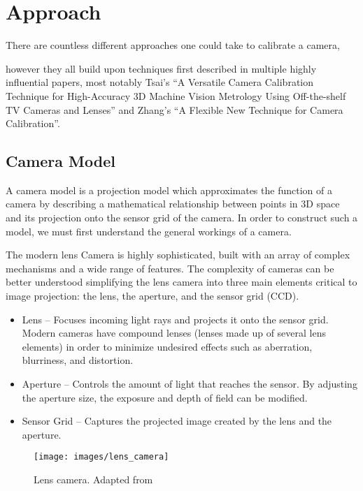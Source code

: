 \section{Approach} 

There are countless different approaches one could take to calibrate a camera, 



however they all build upon techniques first described in multiple highly influential papers, most notably Tsai's ``A Versatile Camera Calibration Technique for High-Accuracy 3D Machine Vision Metrology Using Off-the-shelf TV Cameras and Lenses'' and Zhang's ``A Flexible New Technique for Camera Calibration''. 
\subsection{Camera Model} \label{sec:camera_model}

A camera model is a projection model which approximates the function of a camera by describing a mathematical relationship between points in 3D space and its projection onto the sensor grid of the camera. In order to construct such a model, we must first understand the general workings of a camera.

The modern lens Camera is highly sophisticated, built with an array of complex mechanisms and a wide range of features. The complexity of cameras can be better understood simplifying the lens camera into three main elements critical to image projection: the lens, the aperture, and the sensor grid (CCD). 

\begin{itemize}[leftmargin=!, itemindent=-5ex]
    \item Lens -- Focuses incoming light rays and projects it onto the sensor grid. Modern cameras have compound lenses (lenses made up of several lens elements) in order to minimize undesired effects such as aberration, blurriness, and distortion. 
    \item Aperture -- Controls the amount of light that reaches the sensor. By adjusting the aperture size, the exposure and depth of field can be modified.
    \item Sensor Grid -- Captures the projected image created by the lens and the aperture. 
\end{itemize}

\begin{figure}[H]
    \centering
    \texttt{[image: images/lens\_camera]}
    \caption{Lens camera. Adapted from \cite{coltonPhysics1232012}} \label{fig:lens_camera}
\end{figure}

